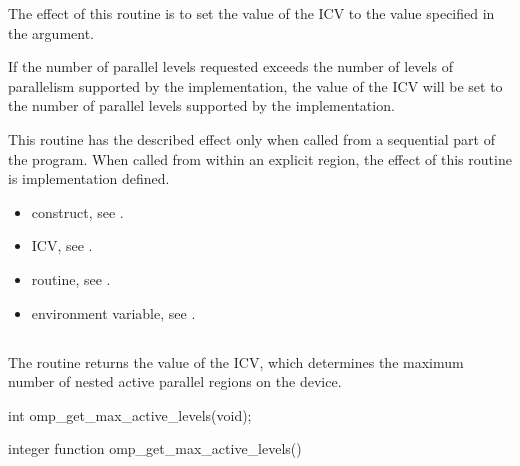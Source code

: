 \effect
The effect of this routine is to set the value of the  ICV to the value
specified in the argument.

If the number of parallel levels requested exceeds the number of levels of parallelism
supported by the implementation, the value of the  ICV will be set
to the number of parallel levels supported by the implementation.

This routine has the described effect only when called from a sequential part of the
program. When called from within an explicit  region, the effect of this
routine is implementation defined.

\crossreferences
\begin{itemize}
\item {} construct, see
.

\item {} ICV, see
.

\item {} routine, see
.

\item {} environment variable, see
.
\end{itemize}










\subsection{}
\label{subsec:omp_get_max_active_levels}
\summary
The  routine returns the value of the
 ICV, which determines the maximum number of nested active parallel regions
on the device.

\format
\begin{ccppspecific}
\begin{ompcFunction}
int omp_get_max_active_levels(void);
\end{ompcFunction}
\end{ccppspecific}

\begin{fortranspecific}
\begin{ompfFunction}
integer function omp_get_max_active_levels()
\end{ompfFunction}
\end{fortranspecific}

